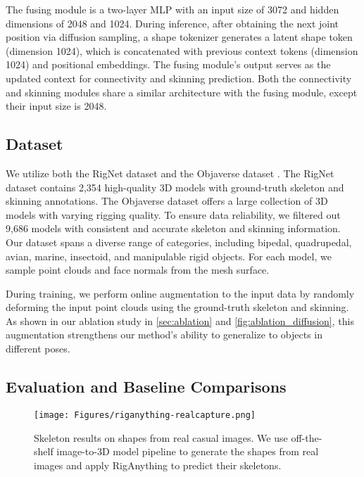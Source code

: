 The fusing module is a two-layer MLP with an input size of 3072 and hidden dimensions of 2048 and 1024. During inference, after obtaining the next joint position via diffusion sampling, a shape tokenizer generates a latent shape token (dimension 1024), which is concatenated with previous context tokens (dimension 1024) and positional embeddings. The fusing module's output serves as the updated context for connectivity and skinning prediction. Both the connectivity and skinning modules share a similar architecture with the fusing module, except their input size is 2048.

\subsection{Dataset}

We utilize both the RigNet dataset \cite{rignet} and the Objaverse dataset \cite{deitke2023objaverse}. The RigNet dataset contains 2,354 high-quality 3D models with ground-truth skeleton and skinning annotations. The Objaverse dataset offers a large collection of 3D models with varying rigging quality. To ensure data reliability, we filtered out 9,686 models with consistent and accurate skeleton and skinning information. Our dataset spans a diverse range of categories, including bipedal, quadrupedal, avian, marine, insectoid, and manipulable rigid objects. For each model, we sample point clouds and face normals from the mesh surface.

During training, we perform online augmentation to the input data by randomly deforming the input point clouds using the ground-truth skeleton and skinning. As shown in our ablation study in \cref{sec:ablation} and \cref{fig:ablation_diffusion}, this augmentation strengthens our method's ability to generalize to objects in different poses.

\subsection{Evaluation and Baseline Comparisons}

\begin{figure*}[t]
\texttt{[image: Figures/riganything-realcapture.png]}
\caption{Skeleton results on shapes from real casual images. We use off-the-shelf image-to-3D model pipeline \cite{liu2024meshformer} to generate the shapes from real images and apply RigAnything to predict their skeletons.}
\label{fig:real_capture}
\end{figure*}

